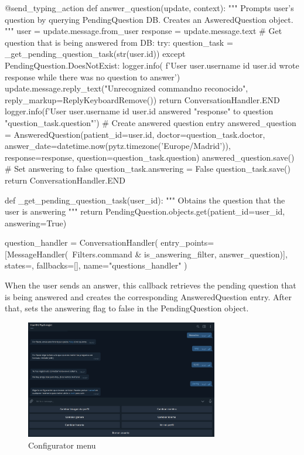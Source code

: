 \documentclass[12pt,english]{article}
\begin{document}
\begin{python}[caption={Questions handler}, captionpos=b]
@send_typing_action
def answer_question(update, context):
    """
    Prompts user's question by querying PendingQuestion DB.
    Creates an AsweredQuestion object.
    """
    user = update.message.from_user
    response = update.message.text
    # Get question that is being answered from DB:
    try:
        question_task = _get_pending_question_task(str(user.id))
    except PendingQuestion.DoesNotExist:
        logger.info(
            f'User {user.username} id {user.id} wrote {response} while there was no question to answer')
        update.message.reply_text("Unrecognized command\nComando no reconocido", reply_markup=ReplyKeyboardRemove())
        return ConversationHandler.END
    logger.info(f'User {user.username} id {user.id} answered "{response}" to question "{question_task.question}"')
    # Create answered question entry
    answered_question = AnsweredQuestion(patient_id=user.id, doctor=question_task.doctor, answer_date=datetime.now(pytz.timezone('Europe/Madrid')), response=response, question=question_task.question)
    answered_question.save()
    # Set answering to false
    question_task.answering = False
    question_task.save()
    return ConversationHandler.END

def _get_pending_question_task(user_id):
    """
    Obtains the question that the user is answering
    """
    return PendingQuestion.objects.get(patient_id=user_id, answering=True)


question_handler = ConversationHandler(
    entry_points=[MessageHandler(~Filters.command & is_answering_filter, answer_question)],
    states={},
    fallbacks=[],
    name="questions_handler"
)

\end{python}

When the user sends an answer, this callback retrieves the pending question that is being answered and creates the corresponding AnsweredQuestion entry. After that, sets the answering flag to false in the PendingQuestion object.

\begin{figure}[H]
  \centering
    \includegraphics[width=0.75\textwidth]{config_menu.png}
  \caption{Configurator menu}
\end{figure}
\end{document}
